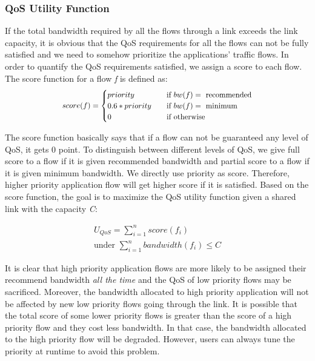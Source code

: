 \subsubsection{QoS Utility Function}
\label{sect:qosUF}
If the total bandwidth required by all the flows through a link exceeds the link capacity, it is obvious that the QoS requirements for
all the flows can not be fully satisfied and we need to somehow prioritize the applications' traffic flows. In order to quantify the QoS
requirements satisfied, we assign a score to each flow. The score function for a flow \emph{f} is defined as:
\begin{equation}
\scalebox{0.9}{
  $score(f) =
    \begin{cases}
      priority       & \quad \text{if } bw(f) = \text{ recommended}\\
      0.6 * priority & \quad \text{if } bw(f) = \text{ minimum}\\
      0              & \quad \text{if } \text{otherwise}\\
    \end{cases}$
}
\end{equation}

The score function basically says that if a flow can not be guaranteed any level of QoS, it gets 0 point. To distinguish between different
levels of QoS, we give full score to a flow if it is given recommended bandwidth and partial score to a flow if it is given minimum bandwidth.
We directly use priority as score. Therefore, higher priority application flow will get higher score if it is satisfied. Based on the score
function, the goal is to maximize the QoS utility function given a shared link with the capacity \emph{C}:

\begin{equation}
\begin{split}
  U_{QoS} = \sum_{i=1}^{n} score(f_i) \\ 
  \text{under } \sum_{i=1}^{n} bandwidth(f_i) \leq C
\end{split}
\end{equation}

It is clear that high priority application flows are more likely to be assigned their recommend bandwidth \emph{all the time} and the QoS of low
priority flows may be sacrificed. Moreover, the bandwidth allocated to high priority application will not be affected by new low priority flows
going through the link. It is possible that the total score of some lower priority flows is greater than the score of a high priority flow and
they cost less bandwidth. In that case, the bandwidth allocated to the high priority flow will be degraded. However, users can always tune the
priority at runtime to avoid this problem.

